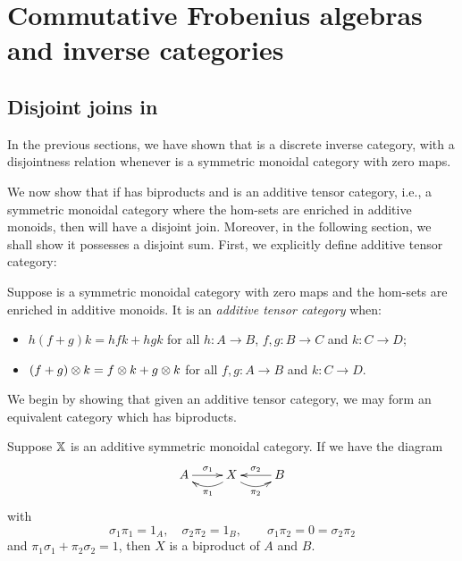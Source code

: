 \chapter{Commutative Frobenius algebras and inverse categories} %
\label{chap:commutative_frobenius_algebras}






\section{Disjoint joins in \CFrob}
\label{sec:disjoint-joins-in-frobenius-algebras}

In the previous sections, we have shown that \CFrob is a discrete inverse category, with a
disjointness relation whenever \X is a symmetric monoidal category with zero maps.

We now show that if \X has biproducts and is an additive tensor category, i.e., a symmetric monoidal
category where the hom-sets are enriched in additive monoids, then \CFrob will have a disjoint
join. Moreover, in the following section, we shall show it possesses a disjoint sum. First, we
explicitly define additive tensor category:

\begin{definition}\label{def:additive-tensor-category}
  Suppose \X is a symmetric monoidal category with zero maps and the hom-sets are enriched in
  additive monoids. It is an \emph{additive tensor category}  when:
  \begin{itemize}
    \item $h(f+g)k = h f k + h g k$ for all $h:A\to B$, $f,g:B\to C$ and $k:C \to  D$;
    \item $(f+g)\otimes k = f\otimes k + g\otimes k$ for all $f,g:A\to B$ and  $k:C\to D$.
  \end{itemize}
\end{definition}

We begin by showing that given an additive tensor category, we may form an equivalent category which has
biproducts.

\begin{lemma}\label{lem:axb_is_a_biproduct}
  Suppose $\mathbb{X}$ is an additive symmetric monoidal category. If we have the diagram
  \[
      \xymatrix{
      A\ar[r]^{\sigma_1} &X\ar@/^9pt/[l]^{\pi_1} \ar@/_9pt/[r]_{\pi_2} & B \ar[l]_{\sigma_2}
    }
  \]
  with
  \[
    \sigma_1\pi_1 = 1_A,\quad\sigma_2\pi_2 = 1_B,\qquad \sigma_1\pi_2 = 0 = \sigma_2\pi_2
  \]
  and $\pi_1\sigma_1 + \pi_2\sigma_2 = 1$, then $X$ is a biproduct of $A$ and $B$.
\end{lemma}


